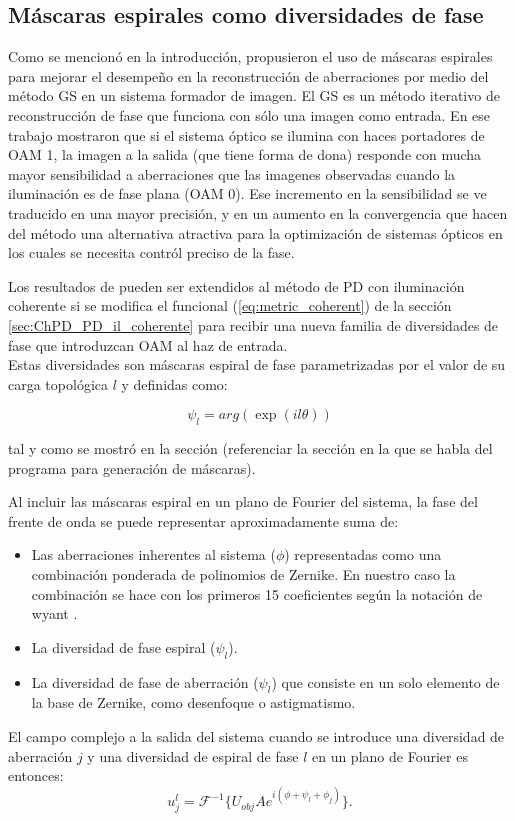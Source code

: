 \subsection{Máscaras espirales como diversidades de fase}
\label{sec:ChPD_PD_Spiral_Diversity}
Como se mencionó en la introducción, 
propusieron el uso de máscaras espirales para mejorar el desempeño en
la reconstrucción de aberraciones por medio del método GS en un
sistema formador de imagen. El GS es un método iterativo de
reconstrucción de fase que funciona con sólo una imagen como
entrada. En ese trabajo mostraron que si el sistema
óptico se ilumina con haces portadores de OAM 1, la imagen a la salida
(que tiene forma de dona) responde con mucha mayor sensibilidad a aberraciones que las
imagenes observadas cuando la iluminación es de fase plana (OAM 0). Ese
incremento en la sensibilidad se ve traducido en una mayor
precisión, y en un aumento en la convergencia que hacen del método una alternativa
atractiva para la optimización de sistemas ópticos en los cuales se
necesita contról preciso de la fase. 

Los resultados de  pueden ser extendidos al
método de PD con iluminación coherente si se modifica el funcional (\ref{eq:metric_coherent}) de la
sección \ref{sec:ChPD_PD_il_coherente} para recibir una nueva familia de
diversidades de fase que introduzcan OAM al haz de entrada. \\
Estas diversidades son máscaras espiral de fase parametrizadas por el
valor de su carga topológica $l$ y definidas como:

$$\psi_l = arg(\exp{(il \theta)})$$

tal y como se mostró en la sección (referenciar la sección en la que
se habla del programa para generación de máscaras). 

Al incluir las máscaras espiral en un plano de Fourier del sistema, la fase del frente de
onda se puede representar aproximadamente suma de:
\begin{itemize}
\item Las aberraciones inherentes al sistema ($\phi$) representadas como una
  combinación ponderada de polinomios de Zernike. En nuestro caso la
  combinación se hace con los primeros 15 coeficientes según la
  notación de wyant . 
\item La diversidad de fase espiral ($\psi_l$).
\item La diversidad de fase de aberración ($\psi_l$) que consiste en
  un solo elemento de la base de Zernike, como desenfoque o
  astigmatismo. 
\end{itemize}
El campo complejo a la salida del sistema cuando se introduce una diversidad de
aberración $j$ y una diversidad de espiral de fase $l$ en un plano de
Fourier es entonces:
\begin{equation}\label{eq:newGP}
 u_j^l =  \mathcal{F}^{- 1}\{U_{obj} A e^{i\left(
     \phi+ \psi_l + \phi_j \right)} \}.
\end{equation}

